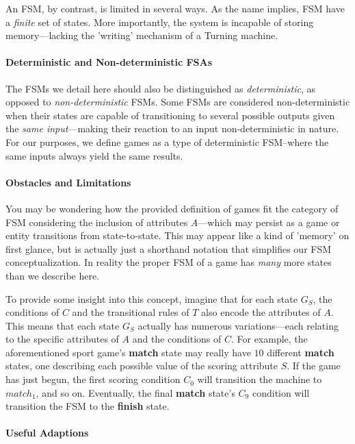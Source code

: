 \documentclass{report}
\newcommand{\state}[1]{\textbf{#1}}
\begin{document}
An FSM, by contrast, is limited in several ways. As the name implies, FSM have a \emph{finite} set of states. More importantly, the system is incapable of storing memory---lacking the 'writing' mechanism of a Turning machine\cite{FSM}. 

\paragraph{Deterministic and Non-deterministic FSAs}

The FSMs we detail here should also be distinguished as \emph{deterministic}, as opposed to \emph{non-deterministic} FSMs. Some FSMs are considered non-deterministic when their states are capable of transitioning to several possible outputs given the \emph{same input}---making their reaction to an input non-deterministic in nature\cite{NDFSA}. For our purposes, we define games as a type of deterministic FSM--where the same inputs always yield the same results. 

\paragraph{Obstacles and Limitations}
You may be wondering how the provided definition of games fit the category of FSM considering the inclusion of attributes $A$---which may persist as a game or entity transitions from state-to-state. This may appear like a kind of 'memory' on first glance, but is actually just a shorthand notation that simplifies our FSM conceptualization. In reality the proper FSM of a game has \emph{many} more states than we describe here. 

To provide some insight into this concept, imagine that for each state $G_S$, the conditions of $C$ and the transitional rules of $T$ also encode the attributes of $A$. This means that each state $G_S$ actually has numerous variations---each relating to the specific attributes of $A$ and the conditions of $C$. For example, the aforementioned sport game's \state{match} state may really have $10$ different \state{match} states, one describing each possible value of the scoring attribute $S$. If the game has just begun, the first scoring condition $C_0$ will transition the machine to $match_1$, and so on. Eventually, the final \state{match} state's $C_9$ condition will transition the FSM to the \state{finish} state.


\paragraph{Useful Adaptions}
\end{document}

